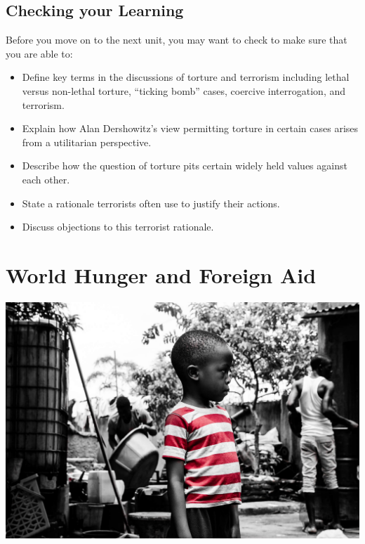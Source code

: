 \documentclass[
]{book}
\providecommand{\tightlist}{%
  \setlength{\itemsep}{0pt}\setlength{\parskip}{0pt}}
\begin{document}
\hypertarget{checking-your-learning-8}{%
\section*{Checking your Learning}\label{checking-your-learning-8}}

\begin{progress}
Before you move on to the next unit, you may want to check to make sure that you
are able to:

\begin{itemize}
\tightlist
\item
  Define key terms in the discussions of torture and terrorism including lethal versus non-lethal torture, ``ticking bomb'' cases, coercive interrogation, and terrorism.\\
\item
  Explain how Alan Dershowitz's view permitting torture in certain cases arises from a utilitarian perspective.\\
\item
  Describe how the question of torture pits certain widely held values against each other.\\
\item
  State a rationale terrorists often use to justify their actions.\\
\item
  Discuss objections to this terrorist rationale.
\end{itemize}
\end{progress}

\hypertarget{world-hunger-and-foreign-aid}{%
\chapter{World Hunger and Foreign Aid}\label{world-hunger-and-foreign-aid}}

\includegraphics{assets/unit_10/U10_kid-2101832_1920.jpg}
\end{document}

